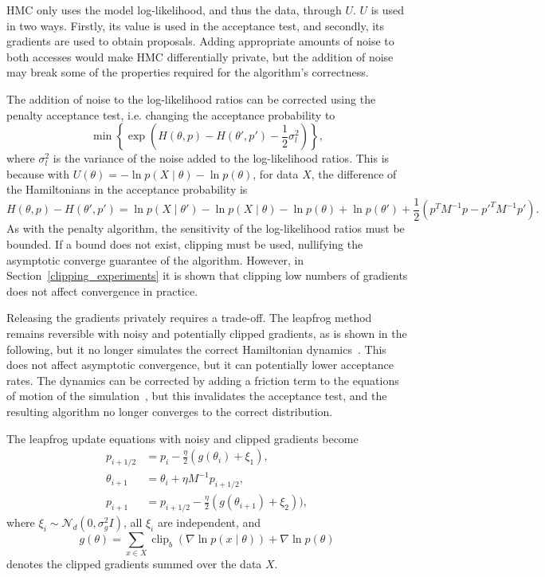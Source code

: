 \documentclass[english,twoside,openright]{HYgraduMLDS}
\newcommand{\caln}{{\mathcal{N}}}
\DeclareMathOperator{\clip}{clip}
\begin{document}
HMC only uses the model log-likelihood, and thus the data, through \(U\).
\(U\) is used in two ways. Firstly, its value is used in the acceptance test,
and secondly, its gradients are used to obtain proposals. Adding appropriate
amounts of noise to both accesses would make HMC differentially private, but the addition of
noise may break some of the properties required for the algorithm's correctness.

The addition of noise to the log-likelihood ratios can be corrected using the penalty
acceptance test, i.e. changing the acceptance probability to
\[
    \min\left\{\exp\left(H(\theta, p) - H(\theta', p') - \frac{1}{2}\sigma_{l}^{2}\right)\right\},
\]
where \(\sigma_{l}^{2}\) is the variance of the noise added to the log-likelihood
ratios. This is because with
\(U(\theta) = -\ln p(X\mid \theta) - \ln p(\theta)\),  for data \(X\),
the difference of the Hamiltonians in the acceptance probability is
\[
  H(\theta, p) - H(\theta', p') = \ln p(X\mid \theta') - \ln p(X\mid \theta)
  - \ln p(\theta) + \ln p(\theta')
  + \frac{1}{2}(p^{T}M^{-1}p - p'^{T}M^{-1}p').
\]
As with the penalty algorithm, the sensitivity of the log-likelihood ratios must
be bounded. If a bound does not exist, clipping must be used, nullifying the asymptotic
converge guarantee of the algorithm. However, in Section~\ref{clipping_experiments}
it is shown that
clipping low numbers of gradients does not affect convergence in practice.

Releasing the gradients privately requires a trade-off. The leapfrog method remains
reversible with noisy and potentially clipped gradients, as is shown in the following,
but it no longer simulates the correct Hamiltonian dynamics~\cite{CFG14}. This does not affect
asymptotic convergence, but it can potentially lower acceptance rates.
The dynamics can be corrected by adding a friction term to the equations of
motion of the simulation~\cite{CFG14}, but this invalidates the acceptance test,
and the resulting algorithm no longer converges to the correct distribution.

The leapfrog update equations with noisy and clipped gradients become
\begin{align*}
  p_{i+1/2} &= p_{i} - \frac{\eta}{2}(g(\theta_{i}) + \xi_{1}), \\
  \theta_{i+1} &= \theta_{i} + \eta M^{-1}p_{i+1/2}, \\
  p_{i+1} &= p_{i+1/2} - \frac{\eta}{2}(g(\theta_{i+1}) + \xi_{2})),
\end{align*}
where
\(\xi_{i} \sim \caln_{d}(0, \sigma_{g}^{2}I)\), all \(\xi_{i}\) are independent, and
\[
  g(\theta) = \sum_{x\in X}\clip_{b}(\nabla \ln p(x\mid \theta)) + \nabla\ln p(\theta)
\]
denotes the clipped gradients summed over the data \(X\).
\end{document}

